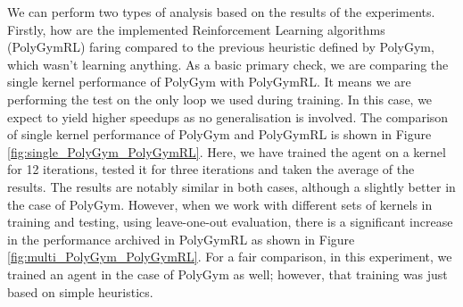 \documentclass[logo,msc]{infthesis}           %
\begin{document}
We can perform two types of analysis based on the results of the experiments. Firstly, how are the implemented Reinforcement Learning algorithms (PolyGymRL) faring compared to the previous heuristic defined by PolyGym, which wasn't learning anything. As a basic primary check, we are comparing the single kernel performance of PolyGym with PolyGymRL. It means we are performing the test on the only loop we used during training. In this case, we expect to yield higher speedups as no generalisation is involved. The comparison of single kernel performance of PolyGym and PolyGymRL is shown in Figure \ref{fig:single_PolyGym_PolyGymRL}. Here, we have trained the agent on a kernel for 12 iterations, tested it for three iterations and taken the average of the results. The results are notably similar in both cases, although a slightly better in the case of PolyGym. However, when we work with different sets of kernels in training and testing, using leave-one-out evaluation, there is a significant increase in the performance archived in PolyGymRL as shown in Figure \ref{fig:multi_PolyGym_PolyGymRL}. For a fair comparison, in this experiment, we trained an agent in the case of PolyGym as well; however, that training was just based on simple heuristics.
\end{document}

